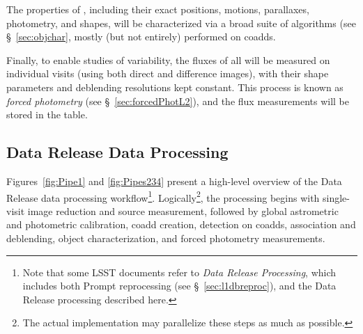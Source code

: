 The properties of \Objects, including their exact positions, motions, parallaxes, photometry, and shapes, will be characterized via a broad suite of algorithms (see \S~\ref{sec:objchar}, mostly (but not entirely) performed on coadds.

Finally, to enable studies of variability, the fluxes of all \Objects will be measured on individual visits (using both
direct and difference images), with their shape parameters and deblending resolutions kept constant. This process is known as \emph{forced photometry} (see \S~\ref{sec:forcedPhotL2}), and the flux measurements will be stored in the \ForcedSource table.

\subsection{Data Release Data Processing}
\label{sec:level2dp}


Figures~\ref{fig:Pipe1} and \ref{fig:Pipes234}
present a high-level overview of the Data Release data processing workflow\footnote{Note that some LSST documents refer to \emph{Data Release Processing}, which includes both Prompt reprocessing (see \S~\ref{sec:l1dbreproc}), and the Data Release processing described here.}. Logically\footnote{The actual implementation may parallelize these steps as much as possible.}, the processing begins with single-visit image reduction and source measurement, followed by global astrometric and photometric calibration, coadd creation, detection on coadds, association and deblending, object characterization, and forced photometry measurements.

